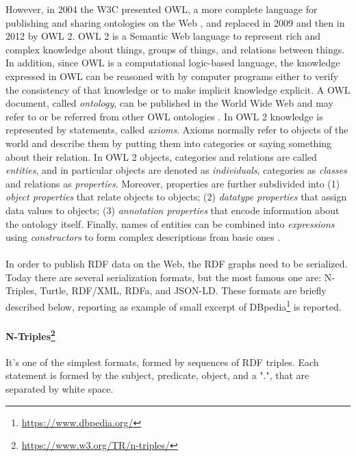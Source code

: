 However, in 2004 the \acl{W3C} presented \ac{OWL}, a more complete language for publishing and sharing ontologies on the Web \cite{bechhofer2004owl}, and replaced in 2009 and then in 2012 by \ac{OWL} 2. \ac{OWL} 2 is a Semantic Web language to represent rich and complex knowledge about things, groups of things, and relations between things. In addition, since \ac{OWL} is a computational logic-based language, the knowledge expressed in \ac{OWL} can be reasoned with by computer programs either to verify the consistency of that knowledge or to make implicit knowledge explicit. A \ac{OWL} document, called \textit{ontology}, can be published in the World Wide Web and may refer to or be referred from other \ac{OWL} ontologies \cite{hitzler2009owl}. In \ac{OWL} 2 knowledge is represented by statements, called \textit{axioms}. Axioms normally refer to objects of the world and describe them by putting them into categories or saying something about their relation. In \ac{OWL} 2 objects, categories and relations are called \textit{entities}, and in particular objects are denoted as \textit{individuals}, categories as \textit{classes} and relations as \textit{properties}. Moreover, properties are further subdivided into (1) \textit{object properties} that relate objects to objects; (2) \textit{datatype properties} that assign data values to objects; (3) \textit{annotation properties} that encode information about the ontology itself. Finally, names of entities can be combined into \textit{expressions} using \textit{constructors} to form complex descriptions from basic ones \cite{hitzler2009owl}.

\paragraph*{}
In order to publish \ac{RDF} data on the Web, the \ac{RDF} graphs need to be serialized. Today there are several serialization formats, but the most famous one are: N-Triples, Turtle, RDF/XML, RDFa, and JSON-LD. These formats are briefly described below, reporting as example of small excerpt of DBpedia\footnote{\url{https://www.dbpedia.org/}} is reported.

\paragraph*{N-Triples\footnote{\url{https://www.w3.org/TR/n-triples/}}} It's one of the simplest formats, formed by sequences of \ac{RDF} triples. Each statement is formed by the subject, predicate, object, and a ".", that are separated by white space.

